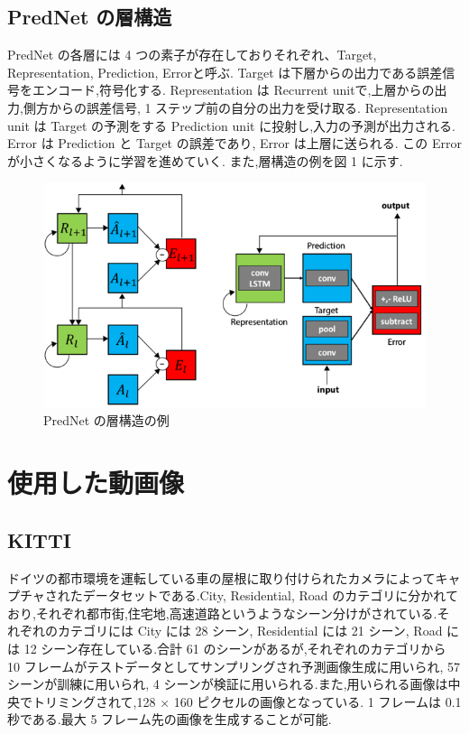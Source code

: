\subsection{PredNet の層構造}
PredNet の各層には 4 つの素子が存在しておりそれぞれ、Target, Representation, Prediction, Errorと呼ぶ.
Target は下層からの出力である誤差信号をエンコード,符号化する.
Representation は Recurrent unitで,上層からの出力,側方からの誤差信号, 1 ステップ前の自分の出力を受け取る.
Representation unit は Target の予測をする Prediction unit に投射し,入力の予測が出力される.
Error は Prediction と Target の誤差であり, Error は上層に送られる.
この Error が小さくなるように学習を進めていく.
また,層構造の例を図 1 に示す.

 \begin{figure}[hb]
\includegraphics[scale=0.4]{prednet.png}
 \caption{PredNet の層構造の例}
\end{figure}
\section{使用した動画像}
\subsection{KITTI}
ドイツの都市環境を運転している車の屋根に取り付けられたカメラによってキャプチャされたデータセットである.City, Residential, Road のカテゴリに分かれており,それぞれ都市街,住宅地,高速道路というようなシーン分けがされている.それぞれのカテゴリには City には 28 シーン, Residential には 21 シーン, Road には 12 シーン存在している.合計 61 のシーンがあるが,それぞれのカテゴリから 10 フレームがテストデータとしてサンプリングされ予測画像生成に用いられ, 57 シーンが訓練に用いられ, 4 シーンが検証に用いられる.また,用いられる画像は中央でトリミングされて,128 × 160 ピクセルの画像となっている. 1 フレームは 0.1 秒である.最大 5 フレーム先の画像を生成することが可能.

